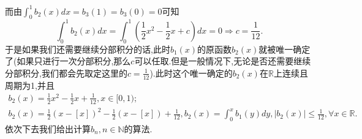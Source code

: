 \documentclass[lang=cn,newtx,10pt,scheme=chinese]{elegantbook}
\begin{document}
\begin{remark}
而由\(\int_{0}^{1}b_2(x)dx =b_3(1)=b_3(0)= 0\)可知
\[
\int_{0}^{1}b_2(x)dx=\int_{0}^{1}\left(\frac{1}{2}x^2-\frac{1}{2}x + c\right)dx = 0\Rightarrow c=\frac{1}{12}.
\]
于是如果我们还需要继续分部积分的话,此时$b_1(x)$的原函数\(b_2(x)\)就被唯一确定了(如果只进行一次分部积分,那么$c$可以任取.但是一般情况下,无论是否还需要继续分部积分,我们都会先取定这里的$c=\frac{1}{12}$).此时这个唯一确定的$b_2(x)$在$\mathbb{R}$上连续且周期为1,\hypertarget{b2性质}{并且}
\begin{gather*}
b_2(x)=\frac{1}{2}x^2-\frac{1}{2}x + \frac{1}{12},x\in[0,1);
\\
b_2(x)=\frac{1}{2}\left( x-\left[ x \right] \right) ^2-\frac{1}{2}\left( x-\left[ x \right] \right) +\frac{1}{12},b_2\left( x \right) =\int_0^x{b_1\left( y \right) dy},\left| b_2\left( x \right) \right|\leqslant \frac{1}{12},\forall x\in \mathbb{R}.
\end{gather*}
依次下去我们给出计算\(b_n,n\in\mathbb{N}\)的算法.
\end{remark}
\end{document}
